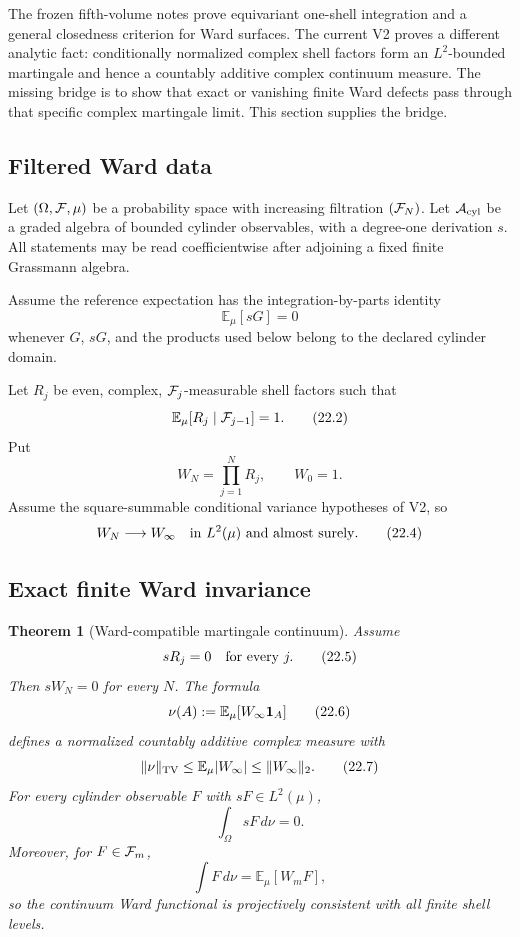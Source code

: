 \documentclass[11pt]{article}
\newtheorem{theorem}{Theorem}[section]
\theoremstyle{remark}
\begin{document}
The frozen fifth-volume notes prove equivariant one-shell integration
and a general closedness criterion for Ward surfaces.  The current
V2 proves a different analytic fact: conditionally normalized complex
shell factors form an \(L^2\)-bounded martingale and hence a
countably additive complex continuum measure.  The missing bridge is
to show that exact or vanishing finite Ward defects pass through that
specific complex martingale limit.  This section supplies the bridge.

\subsection{Filtered Ward data}

Let \((\Omega,{\cal F},\mu)\) be a probability space with increasing
filtration \(({\cal F}_N)\).  Let \({\cal A}_{\rm cyl}\) be a graded
algebra of bounded cylinder observables, with a degree-one derivation
\(s\).  All statements may be read coefficientwise after adjoining a
fixed finite Grassmann algebra.

Assume the reference expectation has the integration-by-parts
identity
\[
                         {\mathbb E}_\mu[sG]=0              \tag{22.1}
\]
whenever \(G\), \(sG\), and the products used below belong to the
declared cylinder domain.

Let \(R_j\) be even, complex, \({\cal F}_j\)-measurable shell factors
such that
\[
 {\mathbb E}_\mu[R_j\mid{\cal F}_{j-1}]=1.                  \tag{22.2}
\]
Put
\[
                         W_N=\prod_{j=1}^N R_j,\qquad W_0=1.
                                                               \tag{22.3}
\]
Assume the square-summable conditional variance hypotheses of V2, so
\[
 W_N\longrightarrow W_\infty
 \quad\hbox{in }L^2(\mu)\hbox{ and almost surely}.           \tag{22.4}
\]

\subsection{Exact finite Ward invariance}

\begin{theorem}[Ward-compatible martingale continuum]
\label{thm:v12v22-Ward}
Assume
\[
                         sR_j=0\quad\hbox{for every }j.      \tag{22.5}
\]
Then \(sW_N=0\) for every \(N\).  The formula
\[
                         \nu(A):=
 {\mathbb E}_\mu[W_\infty{\bf1}_A]                          \tag{22.6}
\]
defines a normalized countably additive complex measure with
\[
                         \|\nu\|_{\rm TV}
 \le{\mathbb E}_\mu|W_\infty|
 \le\|W_\infty\|_2.                                        \tag{22.7}
\]
For every cylinder observable \(F\) with \(sF\in L^2(\mu)\),
\[
                         \boxed{\int_\Omega sF\,d\nu=0.}    \tag{22.8}
\]
Moreover, for \(F\in{\cal F}_m\),
\[
 \int F\,d\nu
 =
 {\mathbb E}_\mu[W_mF],                                    \tag{22.9}
\]
so the continuum Ward functional is projectively consistent with all
finite shell levels.
\end{theorem}
\end{document}
